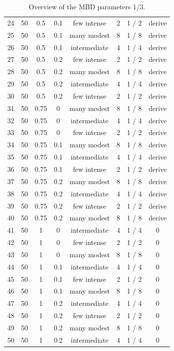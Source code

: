 \documentclass{article}
\begin{document}
\begin{table}
\begin{tabular}{ l | c | c | c | c   c   c | c }
24 & 50 & 0.5 & 0.1 & few intense & 2 & 1 / 2 & derive \\
25 & 50 & 0.5 & 0.1 & many modest  & 8 & 1 / 8 & derive \\
26 & 50 & 0.5 & 0.1 & intermediate & 4 & 1 / 4 & derive \\
27 & 50 & 0.5 & 0.2 & few intense & 2 & 1 / 2 & derive \\
28 & 50 & 0.5 & 0.2 & many modest  & 8 & 1 / 8 & derive \\
29 & 50 & 0.5 & 0.2 & intermediate & 4 & 1 / 4 & derive \\
30 & 50 & 0.5 & 0.2 & few intense & 2 & 1 / 2 & derive \\
31 & 50 & 0.75 & 0 & many modest  & 8 & 1 / 8 & derive \\
32 & 50 & 0.75 & 0 & intermediate & 4 & 1 / 4 & derive \\
33 & 50 & 0.75 & 0 & few intense & 2 & 1 / 2 & derive \\
34 & 50 & 0.75 & 0.1 & many modest  & 8 & 1 / 8 & derive \\
35 & 50 & 0.75 & 0.1 & intermediate & 4 & 1 / 4 & derive \\
36 & 50 & 0.75 & 0.1 & few intense & 2 & 1 / 2 & derive \\
37 & 50 & 0.75 & 0.2 & many modest  & 8 & 1 / 8 & derive \\
38 & 50 & 0.75 & 0.2 & intermediate & 4 & 1 / 4 & derive \\
39 & 50 & 0.75 & 0.2 & few intense & 2 & 1 / 2 & derive \\
40 & 50 & 0.75 & 0.2 & many modest  & 8 & 1 / 8 & derive \\
41 & 50 & 1 & 0 & intermediate & 4 & 1 / 4 & 0 \\
42 & 50 & 1 & 0 & few intense & 2 & 1 / 2 & 0 \\
43 & 50 & 1 & 0 & many modest  & 8 & 1 / 8 & 0 \\
44 & 50 & 1 & 0.1 & intermediate & 4 & 1 / 4 & 0 \\
45 & 50 & 1 & 0.1 & few intense & 2 & 1 / 2 & 0 \\
46 & 50 & 1 & 0.1 & many modest  & 8 & 1 / 8 & 0 \\
47 & 50 & 1 & 0.2 & intermediate & 4 & 1 / 4 & 0 \\
48 & 50 & 1 & 0.2 & few intense & 2 & 1 / 2 & 0 \\
49 & 50 & 1 & 0.2 & many modest  & 8 & 1 / 8 & 0 \\
50 & 50 & 1 & 0.2 & intermediate & 4 & 1 / 4 & 0 \\
    \hline
  \end{tabular}
  \caption{
    Overview of the MBD parameters 1/3. 
  }
  \label{table:mbd_parameters_1}
\end{table}
\end{document}
